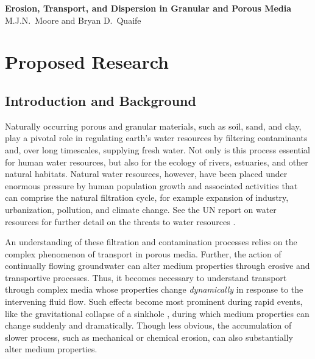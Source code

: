 \documentclass[11pt]{article}
\begin{document}
\begin{center}
{\large \bf Erosion, Transport, and Dispersion in Granular
and Porous Media} 
\\
M.J.N.~Moore and Bryan D.~Quaife
\end{center}


\section{Proposed Research} 

\subsection{Introduction and Background} 

	Naturally occurring porous and granular materials, such as soil, sand, and clay, play a pivotal role in regulating earth's water resources by filtering contaminants and, over long timescales, supplying fresh water. Not only is this process essential for human water resources, but also for the ecology of rivers, estuaries, and other natural habitats. Natural water resources, however, have been placed under enormous pressure by human population growth and associated activities that can comprise the natural filtration cycle, for example expansion of industry, urbanization, pollution, and climate change. See the UN report on water resources for further detail on the threats to water resources \cite{UNwater}.

	An understanding of these filtration and contamination processes relies on the complex phenomenon of transport in porous media. Further, the action of continually flowing groundwater can alter medium properties through erosive and transportive processes. Thus, it becomes necessary to understand transport through complex media whose properties change {\em dynamically} in response to the intervening fluid flow. Such effects become most prominent during rapid events, like the gravitational collapse of a sinkhole \cite{sandhu2018fate}, during which medium properties can change suddenly and dramatically. Though less obvious, the accumulation of slower process, such as mechanical or chemical erosion, can also substantially alter medium properties.
	
\end{document}

